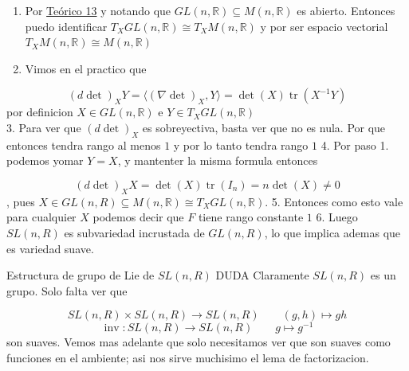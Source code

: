 \begin{bookproof}{}
\begin{enumerate}
\item Por \hyperref[blk:234f1c]{Teórico 13} y notando que $GL(n,\mathbb{R})\subseteq M(n,\mathbb{R})$ es abierto. Entonces puedo identificar $T_{X}GL(n,\mathbb{R})\cong T_{X}M(n,\mathbb{R})$ y por ser espacio vectorial $T_{X}M(n,\mathbb{R})\cong M(n,\mathbb{R})$
\item Vimos en el practico que
\end{enumerate}
\[
(d\det)_X Y=\langle(\nabla\det)_X,Y\rangle=\det(X)\operatorname{tr}(X^{-1}Y)
\]
por definicion $X\in GL(n,\mathbb{R})$ e $Y\in T_{X}GL(n,\mathbb{R})$\\
3. Para ver que $(d\det)_X$ es sobreyectiva, basta ver que no es nula. Por que entonces tendra rango al menos $1$ y por lo tanto tendra rango $1$ 4. Por paso 1. podemos yomar $Y=X$, y mantenter la misma formula entonces

\[
(d\det)_X X=\det(X)\operatorname{tr}(I_n)=n\det(X)\neq0
\]
, pues $X\in GL(n,R)\subseteq M(n,\mathbb{R})\cong T_{X}GL(n,\mathbb{R})$. 5. Entonces como esto vale para cualquier $X$ podemos decir que $F$ tiene rango constante $1$ 6. Luego $SL(n,R)$ es subvariedad incrustada de $GL(n,R)$, lo que implica ademas que es variedad suave.

\bookqed
\end{bookproof}
\label{blk:3ae198}
\begin{bookremark}{Estructura de grupo de Lie de $SL(n,R)$ DUDA}
Claramente $SL(n,R)$ es un grupo. Solo falta ver que

\[
SL(n,R)\times SL(n,R)\to SL(n,R) \qquad (g,h)\mapsto gh
\]
\[
\operatorname{inv}:SL(n,R)\to SL(n,R)\qquad g\mapsto g^{-1}
\]
son suaves. Vemos mas adelante que solo necesitamos ver que son suaves como funciones en el ambiente; asi nos sirve muchisimo el lema de factorizacion.

\end{bookremark}
